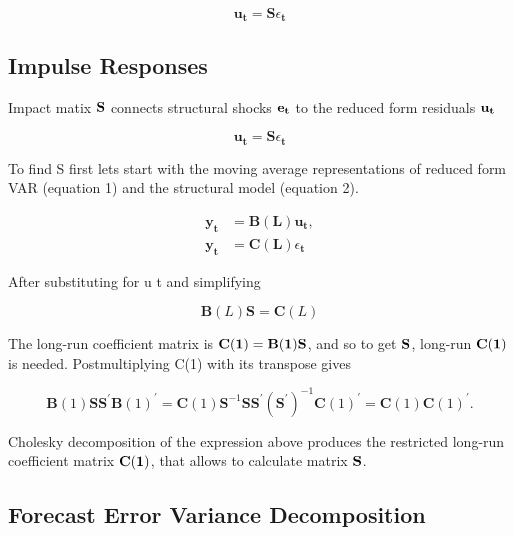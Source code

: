 \documentclass[a4paper,12pt]{article}
\begin{document}
\begin{equation} \label{eq:4}
		\mathbf{u}_{\mathbf{t}}=\mathbf{S} \epsilon_{\mathbf{t}}
\end{equation}

\subsection{Impulse Responses}

Impact matix \(\bf S\) connects structural shocks \(\bf e_t\) to the reduced form residuals \(\bf u_t\)

\begin{equation} \label{eq:5}
		\mathbf{u}_{\mathbf{t}}=\mathbf{S} \epsilon_{\mathbf{t}}
\end{equation}

To find S first lets start with the moving average representations of reduced form VAR (equation 1) and the structural model (equation 2).

\begin{equation} \label{eq:6}
\begin{split}
		\mathbf{y}_{\mathbf{t}} &=\mathbf{B}(\mathbf{L}) \mathbf{u}_{\mathbf{t}}, \\
		\mathbf{y}_{\mathbf{t}} &=\mathbf{C}(\mathbf{L}) \epsilon_{\mathbf{t}}
\end{split}
\end{equation}

After substituting for u t and simplifying

\begin{equation} \label{eq:7}
		\mathbf{B}(L) \mathbf{S}=\mathbf{C}(L)
\end{equation}

The long-run coefficient matrix is \(\bf C(1) = B(1)S\), and so to get \(\bf S\), long-run \(\bf C(1)\) is needed. Postmultiplying C(1) with its transpose gives

\begin{equation} \label{eq:8}
		\mathbf{B}(1) \mathbf{S S}^{\prime} \mathbf{B}(1)^{\prime}=\mathbf{C}(1) \mathbf{S}^{-1} \mathbf{S} \mathbf{S}^{\prime}\left(\mathbf{S}^{\prime}\right)^{-1} \mathbf{C}(1)^{\prime}=\mathbf{C}(1) \mathbf{C}(1)^{\prime}.
\end{equation}

Cholesky decomposition of the expression above produces the restricted long-run coefficient matrix \(\bf C(1)\), that allows to calculate matrix \(\bf S\).

\subsection{Forecast Error Variance Decomposition}
\end{document}
